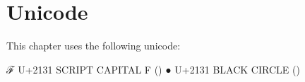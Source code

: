 \begin{fence}
\begin{code}
\AgdaSpace{}%
\AgdaSpace{}%
\<%
\\
%
\>[2]\<%
\\
\>[2][@{}l@{\AgdaIndent{0}}]%
\>[4]\AgdaSpace{}%
\AgdaSpace{}%
\AgdaSpace{}%
\<%
\\
%
\>[2]\<%
\\
\>[0]\AgdaSpace{}%
\AgdaSymbol{\{}\AgdaSymbol{\}}\AgdaSpace{}%
\AgdaSymbol{\{}\AgdaSpace{}%
\AgdaSpace{}%
\AgdaSymbol{\}}\AgdaSpace{}%
\AgdaSymbol{=}\<%
\\
\>[0][@{}l@{\AgdaIndent{0}}]%
\>[3]\AgdaSpace{}%
\AgdaSymbol{(}\AgdaSpace{}%
\AgdaSpace{}%
\AgdaSymbol{)}\<%
\\
\>[0][@{}l@{\AgdaIndent{0}}]%
\>[2]\AgdaSpace{}%
\AgdaSpace{}%
\<%
\\
\>[2][@{}l@{\AgdaIndent{0}}]%
\>[3]\AgdaSpace{}%
\AgdaSpace{}%
\AgdaSpace{}%
\AgdaSpace{}%
\<%
\\
%
\>[2]\AgdaSpace{}%
\AgdaSpace{}%
\AgdaSymbol{(}\AgdaSpace{}%
\AgdaSymbol{\{}\AgdaSpace{}%
\AgdaSymbol{=}\AgdaSpace{}%
\AgdaSymbol{\})}\AgdaSpace{}%
\AgdaSymbol{(}\AgdaSpace{}%
\AgdaSymbol{\{}\AgdaSpace{}%
\AgdaSymbol{=}\AgdaSpace{}%
\AgdaSymbol{\})}\AgdaSpace{}%
\<%
\\
\>[2][@{}l@{\AgdaIndent{0}}]%
\>[3]\AgdaSpace{}%
\AgdaSpace{}%
\AgdaSpace{}%
\AgdaSpace{}%
\AgdaSpace{}%
\AgdaSpace{}%
\<%
\\
%
\>[2]\<%
\\
\>[2][@{}l@{\AgdaIndent{0}}]%
\>[4]\AgdaSpace{}%
\AgdaSpace{}%
\AgdaSpace{}%
\AgdaSpace{}%
\<%
\\
%
\>[2]\<%
\end{code}
\end{fence}

\hypertarget{unicode}{%
\section{Unicode}\label{unicode}}

This chapter uses the following unicode:

\begin{myDisplay}
ℱ  U+2131  SCRIPT CAPITAL F (\McF)
●  U+2131  BLACK CIRCLE (\cib)
\end{myDisplay}


